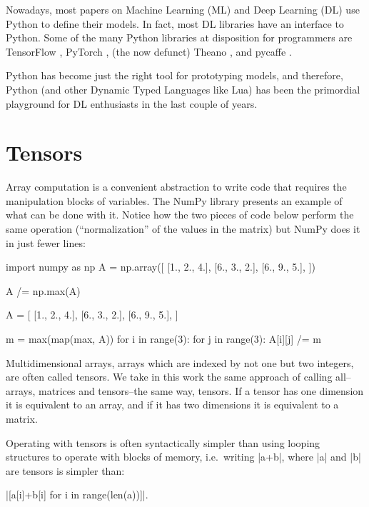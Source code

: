 Nowadays, most papers on Machine Learning (ML) and Deep Learning (DL)
use Python to define their models. In fact, most DL libraries have an
interface to Python. Some of the many Python libraries at disposition
for programmers are TensorFlow \autocite{abadi_tensorflow_2016},
PyTorch \autocite{paszke2017pytorch}, (the now defunct) Theano
\autocite{bergstra2011theano}, and pycaffe \autocite[as part of the
Caffe framework]{jia2014caffe}.

Python has become just the right tool for prototyping models, and
therefore, Python (and other Dynamic Typed Languages like Lua) has been
the primordial playground for DL enthusiasts in the last couple of
years.

\section{Tensors}\label{tensors}

Array computation is a convenient abstraction to write code that
requires the manipulation blocks of variables. The NumPy library
presents an example of what can be done with it. Notice how the two
pieces of code below perform the same operation (\enquote{normalization}
of the values in the matrix) but NumPy does it in just fewer lines:

\begin{pythoncode}
import numpy as np
A = np.array([
  [1., 2., 4.],
  [6., 3., 2.],
  [6., 9., 5.],
])

A /= np.max(A)
\end{pythoncode}

\begin{pythoncode}
A = [
  [1., 2., 4.],
  [6., 3., 2.],
  [6., 9., 5.],
]

m = max(map(max, A))
for i in range(3):
  for j in range(3):
    A[i][j] /= m
\end{pythoncode}

Multidimensional arrays, arrays which are indexed by not one but two
integers, are often called tensors. We take in this work the same
approach of calling all--arrays, matrices and tensors--the same way,
tensors. If a tensor has one dimension it is equivalent to an array, and
if it has two dimensions it is equivalent to a matrix.

Operating with tensors is often syntactically simpler than using looping
structures to operate with blocks of memory, i.e.~writing \pycode|a+b|,
where \pycode|a| and \pycode|b| are tensors is simpler than:

\pycode|[a[i]+b[i] for i in range(len(a))]|.

